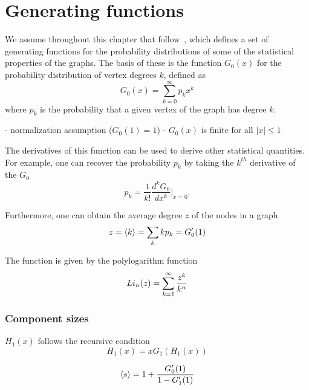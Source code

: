 \section{Generating functions} %
\label{sec:generating_functions}



We assume throughout this chapter that  follow~\cite{Newman:zFi032Kd}, which defines a set of generating functions for the probability distributions of some of the statistical properties of the graphs.
The basis of these is the function $G_0(x)$ for the probability distribution of vertex degrees $k$, defined as
\begin{equation}
G_0(x) = \sum_{k=0}^{\infty} p_k x^k
\end{equation}
where $p_k$ is the probability that a given vertex of the graph has degree $k$.

- normalization assumption ($G_0(1) = 1$)
- $G_0(x)$ is finite for all $|x| \le 1$

The derivatives of this function can be used to derive other statistical quantities.
For example, one can recover the probability $p_k$ by taking the $k^{th}$ derivative of the $G_0$
\begin{equation}
	p_k = \frac{1}{k!} \frac{d^k G_0}{dx^k} \Big|_{x=0}.
\end{equation}

Furthermore, one can obtain the average degree $z$ of the nodes in a graph 
\begin{equation}
	z = \left< k \right> = \sum_k k p_k = G'_0(1)
\end{equation}

The function is given by the polylogarithm function
\begin{equation}
	Li_{n} ({z}) = \sum_{k=1}^{\infty} \frac{z^k}{k^n}
\end{equation}

\subsubsection{Component sizes} %
\label{ssub:component_sizes}

$H_1(x)$ follows the recursive condition
\begin{equation}
	H_1(x) = x G_1( H_1(x))
\end{equation}








\begin{equation}
\left< s \right> = 1 + \frac{G'_0(1)}{1-G'_1(1)}	
\end{equation}




